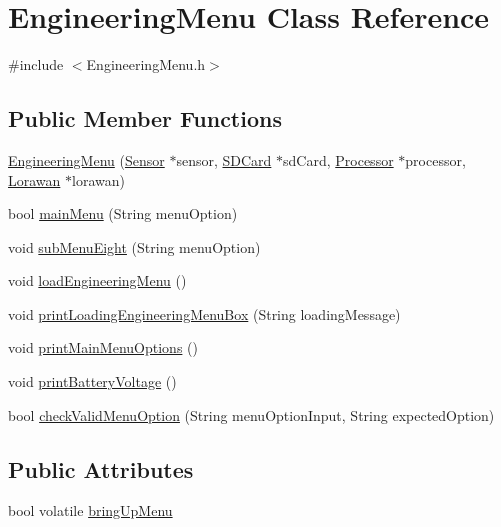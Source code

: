 \hypertarget{class_engineering_menu}{}\section{Engineering\+Menu Class Reference}
\label{class_engineering_menu}


{\ttfamily \#include $<$Engineering\+Menu.\+h$>$}

\subsection*{Public Member Functions}
\begin{DoxyCompactItemize}
\item 
\mbox{\hyperlink{class_engineering_menu_a4bcf5258ea838710a982fe6cff1ad0bc}{Engineering\+Menu}} (\mbox{\hyperlink{class_sensor}{Sensor}} $\ast$sensor, \mbox{\hyperlink{class_s_d_card}{S\+D\+Card}} $\ast$sd\+Card, \mbox{\hyperlink{class_processor}{Processor}} $\ast$processor, \mbox{\hyperlink{class_lorawan}{Lorawan}} $\ast$lorawan)
\item 
bool \mbox{\hyperlink{class_engineering_menu_a095890ce37adcbbe82ede76c6b2ddc06}{main\+Menu}} (String menu\+Option)
\item 
void \mbox{\hyperlink{class_engineering_menu_adc87bea9b0a4ae094eb4ae87fac5b9a7}{sub\+Menu\+Eight}} (String menu\+Option)
\item 
void \mbox{\hyperlink{class_engineering_menu_a1fdb55127655851a918ba357206f0b1f}{load\+Engineering\+Menu}} ()
\item 
void \mbox{\hyperlink{class_engineering_menu_a414a551c8e696dc32b41899ee7367a24}{print\+Loading\+Engineering\+Menu\+Box}} (String loading\+Message)
\item 
void \mbox{\hyperlink{class_engineering_menu_acdf6585caa040c7d5ad5277dc68e2639}{print\+Main\+Menu\+Options}} ()
\item 
void \mbox{\hyperlink{class_engineering_menu_a6547a9143f33fe493c22d82b149d40bf}{print\+Battery\+Voltage}} ()
\item 
bool \mbox{\hyperlink{class_engineering_menu_a607200a4b3f43c227f35df325b79e12c}{check\+Valid\+Menu\+Option}} (String menu\+Option\+Input, String expected\+Option)
\end{DoxyCompactItemize}
\subsection*{Public Attributes}
\begin{DoxyCompactItemize}
\item 
bool volatile \mbox{\hyperlink{class_engineering_menu_a77d214538bd5dbf2be427351701f71b7}{bring\+Up\+Menu}}
\end{DoxyCompactItemize}



